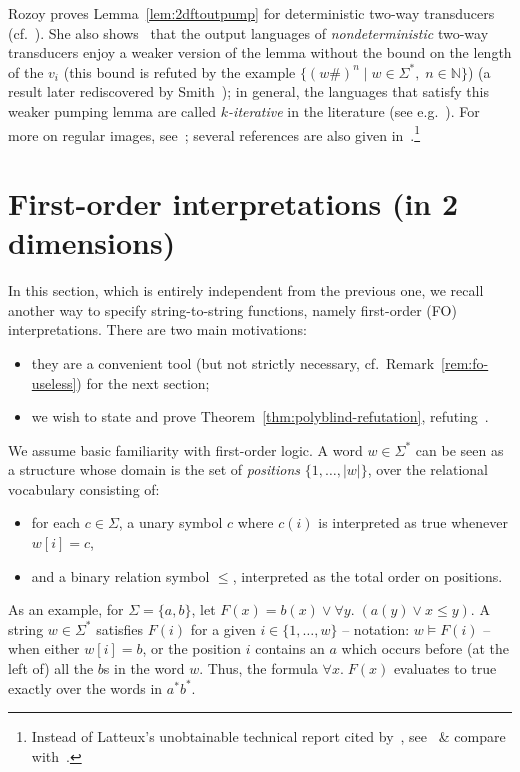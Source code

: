 \documentclass{fundam}
\theoremstyle{claimstyle}
\begin{document}
\begin{remark}\label{rem:iterative}
  Rozoy proves Lemma~\ref{lem:2dftoutpump} for deterministic two-way transducers (cf.~). She also shows~\cite[\S4.2]{Rozoy} that the output languages of \emph{nondeterministic} two-way transducers enjoy a weaker version of the lemma without the bound on the length of the $v_i$ (this bound is refuted by the example $\{(w\#)^n \mid w \in \Sigma^*,\; n \in \mathbb{N}\}$) (a result later rediscovered by Smith~\cite{Pumping2NFT}); in general, the languages that satisfy this weaker pumping lemma are called \emph{$k$-iterative} in the literature (see e.g.~\cite{Pumping2NFT,KanazawaKMSY14}). For more on regular images, see~\cite{EhrichY71,EngelfrietH91}; several references are also given in~\cite[p.~18]{GauwinHDR}.\footnote{Instead of Latteux's unobtainable
  technical report cited by~\cite{GauwinHDR}, see~\cite[Prop.~I.2]{Latteux79} \& compare with~\cite{Rajlich72}.}
\end{remark}

\section{First-order interpretations (in 2 dimensions)}
\label{sec:fo-interpretations}

In this section, which is entirely independent from the previous one, we
recall another way to specify string-to-string functions, namely first-order
(FO) interpretations. There are two main motivations:
\begin{itemize}
\item they are a convenient tool (but not strictly necessary, cf.~Remark~\ref{rem:fo-useless}) for the next section;
\item we wish to state and prove Theorem~\ref{thm:polyblind-refutation},
  refuting~\cite[Conjecture~10.1]{NguyenNP21}.
\end{itemize}
We assume basic familiarity with first-order logic.
A word $w\in\Sigma^*$ can be seen as a structure whose domain is the set of \emph{positions} $\{1,\dots,|w|\}$, over the relational vocabulary consisting of:
\begin{itemize}
  \item for each $c\in\Sigma$, a unary symbol $c$ where $c(i)$ is interpreted as true whenever $w[i]=c$,
  \item and a binary relation symbol $\leq$, interpreted as the total order on positions.
\end{itemize}
As an example, for $\Sigma=\{a,b\}$, let $F(x) = b(x) \lor \forall y.\; (a(y) \lor x \leq y)$. A string $w\in\Sigma^*$ satisfies $F(i)$ for a given $i\in\{1,\dots,w\}$ -- notation: $w \models F(i)$ -- when either $w[i]=b$, or the position $i$ contains an $a$ which occurs before (at the left of) all the $b$s in the word $w$. Thus, the formula $\forall x.\; F(x)$ evaluates to true exactly over the words in $a^*b^*$.
\end{document}

